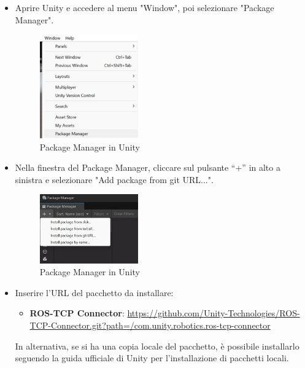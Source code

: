 \documentclass[11pt]{report}
\begin{document}
\begin{itemize}
    \item Aprire Unity e accedere al menu "Window", poi selezionare "Package Manager".
    \begin{figure}[h]
        \centering
        \includegraphics[width=0.4\textwidth]{images/rostcp.jpg}
        \caption{Package Manager in Unity}
        \label{fig:rostcp}
    \end{figure}
    
    \item Nella finestra del Package Manager, cliccare sul pulsante “+” in alto a sinistra e selezionare "Add package from git URL...".
    \begin{figure}[h]
        \centering
        \includegraphics[width=0.4\textwidth]{images/rostcp1.jpg}
        \caption{Package Manager in Unity}
        \label{fig:rostcp1}
    \end{figure}

    \item Inserire l’URL del pacchetto da installare:
    \begin{itemize}
        \item \textbf{ROS-TCP Connector}: 
        \url{https://github.com/Unity-Technologies/ROS-TCP-Connector.git?path=/com.unity.robotics.ros-tcp-connector}
    \end{itemize}
    
    In alternativa, se si ha una copia locale del pacchetto, è possibile installarlo seguendo la guida ufficiale di Unity per l’installazione di pacchetti locali.
\end{itemize}
\end{document}
